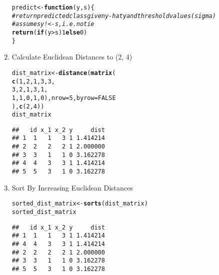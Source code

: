 \documentclass[../../dsa1101_notes.Rtex]{subfiles}\usepackage[]{graphicx}\usepackage[]{color}
\makeatletter
\newcommand{\hlnum}[1]{\textcolor[rgb]{0.686,0.059,0.569}{#1}}%
\newcommand{\hlcom}[1]{\textcolor[rgb]{0.678,0.584,0.686}{\textit{#1}}}%
\newcommand{\hlopt}[1]{\textcolor[rgb]{0,0,0}{#1}}%
\newcommand{\hlstd}[1]{\textcolor[rgb]{0.345,0.345,0.345}{#1}}%
\newcommand{\hlkwa}[1]{\textcolor[rgb]{0.161,0.373,0.58}{\textbf{#1}}}%
\newcommand{\hlkwb}[1]{\textcolor[rgb]{0.69,0.353,0.396}{#1}}%
\newcommand{\hlkwc}[1]{\textcolor[rgb]{0.333,0.667,0.333}{#1}}%
\newcommand{\hlkwd}[1]{\textcolor[rgb]{0.737,0.353,0.396}{\textbf{#1}}}%
\newenvironment{kframe}{%
 \def\at@end@of@kframe{}%
 \ifinner\ifhmode%
  \def\at@end@of@kframe{\end{minipage}}%
  \begin{minipage}{\columnwidth}%
 \fi\fi%
 \def\FrameCommand##1{\hskip\@totalleftmargin \hskip-\fboxsep
 \colorbox{shadecolor}{##1}\hskip-\fboxsep
     \hskip-\linewidth \hskip-\@totalleftmargin \hskip\columnwidth}%
 \MakeFramed {\advance\hsize-\width
   \@totalleftmargin\z@ \linewidth\hsize
   \@setminipage}}%
 {\par\unskip\endMakeFramed%
 \at@end@of@kframe}
\newenvironment{knitrout}{}{} %
\makeatother
\begin{document}
\begin{enumerate}
\begin{knitrout}
\begin{kframe}
\begin{alltt}
\hlstd{predict} \hlkwb{<-} \hlkwa{function}\hlstd{(}\hlkwc{y}\hlstd{,} \hlkwc{s}\hlstd{) \{}
 \hlcom{# return predicted class given y-hat y and threshold value s (sigma)}
 \hlcom{# assumes y !<- s, i.e. no tie}
 \hlkwd{return} \hlstd{(}\hlkwa{if} \hlstd{(y} \hlopt{>} \hlstd{s)} \hlnum{1} \hlkwa{else} \hlnum{0}\hlstd{)}
\hlstd{\}}
\end{alltt}
\end{kframe}
\end{knitrout}
\item Calculate Euclidean Distances to (2, 4)
\begin{knitrout}
\color{fgcolor}\begin{kframe}
\begin{alltt}
\hlstd{dist_matrix} \hlkwb{<-} \hlkwd{distance}\hlstd{(}\hlkwd{matrix}\hlstd{(}
  \hlkwd{c}\hlstd{(}\hlnum{1}\hlstd{,}\hlnum{2}\hlstd{,}\hlnum{1}\hlstd{,}\hlnum{3}\hlstd{,}\hlnum{3}\hlstd{,}
    \hlnum{3}\hlstd{,}\hlnum{2}\hlstd{,}\hlnum{1}\hlstd{,}\hlnum{3}\hlstd{,}\hlnum{1}\hlstd{,}
    \hlnum{1}\hlstd{,}\hlnum{1}\hlstd{,}\hlnum{0}\hlstd{,}\hlnum{1}\hlstd{,}\hlnum{0}\hlstd{),} \hlkwc{nrow} \hlstd{=} \hlnum{5}\hlstd{,} \hlkwc{byrow} \hlstd{=} \hlnum{FALSE}
\hlstd{),} \hlkwd{c}\hlstd{(}\hlnum{2}\hlstd{,} \hlnum{4}\hlstd{))}
\hlstd{dist_matrix}
\end{alltt}
\begin{verbatim}
##   id x_1 x_2 y     dist
## 1  1   1   3 1 1.414214
## 2  2   2   2 1 2.000000
## 3  3   1   1 0 3.162278
## 4  4   3   3 1 1.414214
## 5  5   3   1 0 3.162278
\end{verbatim}
\end{kframe}
\end{knitrout}
\item Sort By Increasing Euclidean Distances
\begin{knitrout}
\color{fgcolor}\begin{kframe}
\begin{alltt}
\hlstd{sorted_dist_matrix} \hlkwb{<-} \hlkwd{sorts}\hlstd{(dist_matrix)}
\hlstd{sorted_dist_matrix}
\end{alltt}
\begin{verbatim}
##   id x_1 x_2 y     dist
## 1  1   1   3 1 1.414214
## 4  4   3   3 1 1.414214
## 2  2   2   2 1 2.000000
## 3  3   1   1 0 3.162278
## 5  5   3   1 0 3.162278
\end{verbatim}
\end{kframe}
\end{knitrout}

\end{enumerate}
\end{document}
